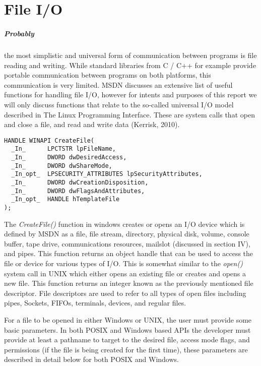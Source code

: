 \documentclass[11pt]{report}
\begin{document}
\chapter{File I/O}
\paragraph{Probably} the most simplistic and universal form of communication between programs is file reading and writing. While standard libraries from C / C++ for example provide portable communication between programs on both platforms, this communication is very limited. MSDN discusses an extensive list of useful functions for handling file I/O, however for intents and purposes of this report we will only discuss functions that relate to the so-called universal I/O model described in The Linux Programming Interface. These are system calls that open and close a file, and read and write data (Kerrisk, 2010).

\begin{verbatim}
HANDLE WINAPI CreateFile(
  _In_      LPCTSTR lpFileName,
  _In_      DWORD dwDesiredAccess,
  _In_      DWORD dwShareMode,
  _In_opt_  LPSECURITY_ATTRIBUTES lpSecurityAttributes,
  _In_      DWORD dwCreationDisposition,
  _In_      DWORD dwFlagsAndAttributes,
  _In_opt_  HANDLE hTemplateFile
);
\end{verbatim}
 
The \textit{CreateFile()} function in windows creates or opens an I/O device which is defined by MSDN as a file, file stream, directory, physical disk, volume, console buffer, tape drive, communications resources, mailslot (discussed in section IV), and pipes. This function returns an object handle that can be used to access the file or device for various types of I/O. This is somewhat similar to the \textit{open()} system call in UNIX which either opens an existing file or creates and opens a new file. This function returns an integer known as the previously mentioned file descriptor. File descriptors are used to refer to all types of open files including pipes, Sockets, FIFOs, terminals, devices, and regular files.

For a file to be opened in either Windows or UNIX, the user must provide some basic parameters. In both POSIX and Windows based APIs the developer must provide at least a pathname to target to the desired file, access mode flags, and permissions (if the file is being created for the first time), these parameters are described in detail below for both POSIX and Windows.
 
\end{document}
